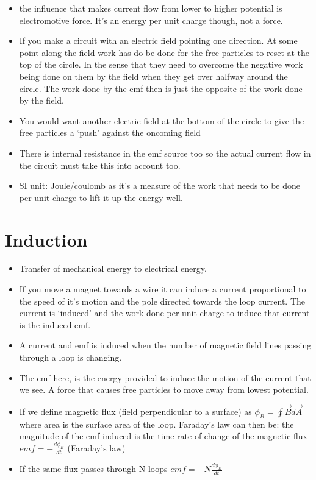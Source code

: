 \documentclass[11pt]{article}
\begin{document}
\begin{itemize}
\tightlist
\item
  the influence that makes current flow from lower to higher potential
  is electromotive force. It's an energy per unit charge though, not a
  force.
\item
  If you make a circuit with an electric field pointing one direction.
  At some point along the field work has do be done for the free
  particles to reset at the top of the circle. In the sense that they
  need to overcome the negative work being done on them by the field
  when they get over halfway around the circle. The work done by the emf
  then is just the opposite of the work done by the field.
\item
  You would want another electric field at the bottom of the circle to
  give the free particles a `push' against the oncoming field
\item
  There is internal resistance in the emf source too so the actual
  current flow in the circuit must take this into account too.
\item
  SI unit: Joule/coulomb as it's a measure of the work that needs to be
  done per unit charge to lift it up the energy well.
\end{itemize}

\hypertarget{induction}{%
\section{Induction}\label{induction}}

\begin{itemize}
\tightlist
\item
  Transfer of mechanical energy to electrical energy.
\item
  If you move a magnet towards a wire it can induce a current
  proportional to the speed of it's motion and the pole directed towards
  the loop current. The current is `induced' and the work done per unit
  charge to induce that current is the induced emf.
\item
  A current and emf is induced when the number of magnetic field lines
  passing through a loop is changing.
\item
  The emf here, is the energy provided to induce the motion of the
  current that we see. A force that causes free particles to move away
  from lowest potential.
\item
  If we define magnetic flux (field perpendicular to a surface) as
  \(\phi_B = \oint{\vec{B}d\vec{A}}\) where area is the surface area of
  the loop. Faraday's law can then be: the magnitude of the emf induced
  is the time rate of change of the magnetic flux
  \(emf = -\frac{d\phi_B}{dt}\) (Faraday's law)
\item
  If the same flux passes through N loops \(emf = -N\frac{d\phi_B}{dt}\)
\end{itemize}
\end{document}
